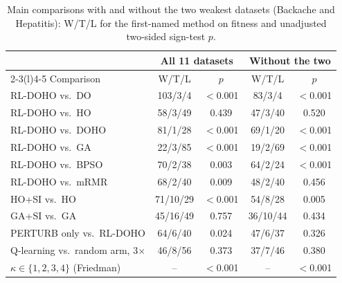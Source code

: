 \documentclass[pdflatex,sn-basic]{sn-jnl}
\begin{document}
\begin{table}[t]
\centering
\caption{Main comparisons with and without the two weakest datasets (Backache and Hepatitis): W/T/L for the first-named method on fitness and unadjusted two-sided sign-test $p$.}
\label{tab:weak}
\footnotesize
\setlength{\tabcolsep}{2.4pt}
\begin{tabular}{@{}lcccc@{}}
\toprule
& \multicolumn{2}{c}{All 11 datasets} & \multicolumn{2}{c}{Without the two} \\
\cmidrule(lr){2-3}\cmidrule(l){4-5}
Comparison & W/T/L & $p$ & W/T/L & $p$ \\
\midrule
RL-DOHO vs.\ DO & 103/3/4 & $<$0.001 & 83/3/4 & $<$0.001 \\
RL-DOHO vs.\ HO & 58/3/49 & 0.439 & 47/3/40 & 0.520 \\
RL-DOHO vs.\ DOHO & 81/1/28 & $<$0.001 & 69/1/20 & $<$0.001 \\
RL-DOHO vs.\ GA & 22/3/85 & $<$0.001 & 19/2/69 & $<$0.001 \\
RL-DOHO vs.\ BPSO & 70/2/38 & 0.003 & 64/2/24 & $<$0.001 \\
RL-DOHO vs.\ mRMR & 68/2/40 & 0.009 & 48/2/40 & 0.456 \\
HO+SI vs.\ HO & 71/10/29 & $<$0.001 & 54/8/28 & 0.005 \\
GA+SI vs.\ GA & 45/16/49 & 0.757 & 36/10/44 & 0.434 \\
PERTURB only vs.\ RL-DOHO & 64/6/40 & 0.024 & 47/6/37 & 0.326 \\
Q-learning vs.\ random arm, 3$\times$ & 46/8/56 & 0.373 & 37/7/46 & 0.380 \\
$\kappa\in\{1,2,3,4\}$ (Friedman) & -- & $<$0.001 & -- & $<$0.001 \\
\bottomrule
\end{tabular}
\end{table}
\end{document}
